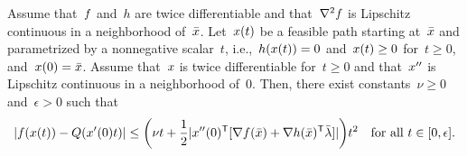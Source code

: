 \begin{theorem}
    \label{thm:sqp-path}
    Assume that~$f$ and~$h$ are twice differentiable and that~$\nabla^2 f$ is Lipschitz continuous in a neighborhood of~$\bar{\iter}$.
    Let~$\iter(t)$ be a feasible path starting at~$\bar{\iter}$ and parametrized by a nonnegative scalar~$t$, i.e.,~$h(\iter(t)) = 0$ and~$\iter(t) \ge 0$ for~$t \ge 0$, and~$\iter(0) = \bar{\iter}$.
    Assume that~$\iter$ is twice differentiable for~$t \ge 0$ and that~$\iter''$ is Lipschitz continuous in a neighborhood of~$0$.
    Then, there exist constants~$\nu \ge 0$ and~$\epsilon > 0$ such that
    \begin{equation*}
        \abs{\obj(\iter(t)) - Q(x'(0) t)} \le \bigg( \nu t + \frac{1}{2}\abs{\iter''(0)^{\T} [\nabla \obj(\bar{\iter}) + \nabla h(\bar{\iter})^{\T} \bar{\lm}]} \bigg) t^2 \quad \text{for all~$t \in [0, \epsilon]$.}
    \end{equation*}
\end{theorem}

